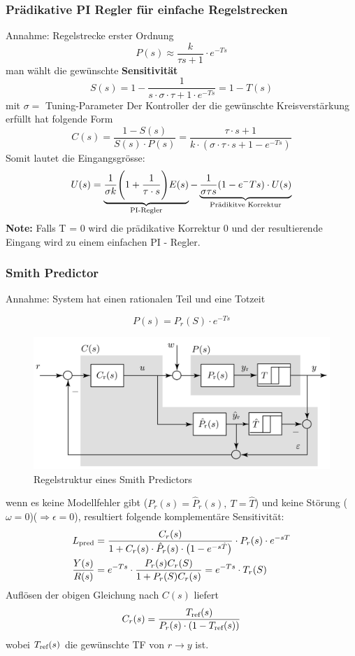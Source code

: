     
    \subsubsection{Prädikative PI Regler für einfache Regelstrecken}
        Annahme: Regelstrecke erster Ordnung 
        \[P(s)\approx \frac{k}{\tau s + 1}\cdot e^{-Ts}\]
        man wählt die gewünschte \textbf{Sensitivität} 
        \[S(s) = 1- \frac{1}{s\cdot\sigma\cdot \tau + 1 \cdot e^{-Ts}} = 1 - T(s) \]
        mit $\sigma = $ Tuning-Parameter
        Der Kontroller der die gewünschte Kreisverstärkung erfüllt hat folgende Form 
        \[C(s) =\frac{1-S(s)}{S(s)\cdot P(s)}= \frac{\tau\cdot s+1}{k\cdot(\sigma\cdot\tau\cdot s+ 1-e^{-Ts})}\]
        Somit lautet die Eingangsgrösse: 
        \[U(s)=\underbrace{\frac{1}{\sigma k}\Bigg(1+\frac{1}{\tau\cdot s}\Bigg)E(s)}_{\textnormal{PI-Regler}} - \underbrace{\frac{1}{\sigma\tau s}(1-e^-{Ts})\cdot U(s)}_{\textnormal{Prädikitve Korrektur}}\] 
    \textbf{Note:} Falls T = 0 wird die prädikative Korrektur 0 und der resultierende Eingang wird zu einem einfachen PI - Regler.
    \subsubsection{Smith Predictor}
    Annahme: System hat einen rationalen Teil und eine Totzeit
    
    \[P(s) = P_r(S)\cdot e^{-Ts}\]
    \begin{figure}[H]
        \centering
        \includegraphics[width = 0.7\linewidth]{images/02/Smithpredictor.jpg}
        \caption{Regelstruktur eines Smith Predictors}
    \end{figure}
    
    wenn es keine Modellfehler gibt ($P_r(s) = \hat P_r(s),\ T = \hat T$) und keine Störung ($\omega = 0$)($\Rightarrow \epsilon = 0$), resultiert folgende komplementäre Sensitivität:
    \begin{align*}
        L_{\textnormal{pred}} &= \frac{C_r(s)}{1 + C_r(s)\cdot\hat{P}_r(s)\cdot\big(1 - e^{-s\hat{T}}\big)}\cdot P_r(s)\cdot e^{-sT}\\
        \frac{Y(s)}{R(s)} &= e^{-Ts}\cdot\frac{P_r(s)C_r(S)}{1+P_r(S)C_r(s)} = e^{-Ts}\cdot T_r(S)
    \end{align*}
    Auflösen der obigen Gleichung nach $C(s)$ liefert
    \begin{equation*}
        C_r(s) = \frac{T_{\textnormal{ref}}(s)}{P_r(s)\cdot(1-T_{\textnormal{ref}}(s))}
    \end{equation*}
    wobei $T_\textnormal{ref}(s)$ die gewünschte TF von $r\rightarrow y$ ist.
    
